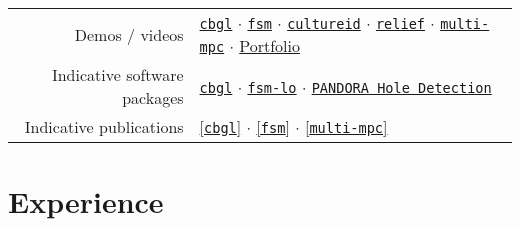 \documentclass[a4paper,10pt,twoside]{article}
\begin{document}
\vspace{+0.1cm}
\begin{tabular}{rl}

  Demos / videos & \href{https://www.youtube.com/watch?v=xaDKjI0WkDc}{\texttt{cbgl}} $\cdot$ \href{https://www.youtube.com/watch?v=hB4qsHCEXGI}{\texttt{fsm}} $\cdot$ \href{https://cultureid.web.auth.gr/?page\_id=200&lang=en}{\texttt{cultureid}} $\cdot$ \href{https://relief.web.auth.gr/}{\texttt{relief}} $\cdot$ \href{https://www.youtube.com/watch?v=937OZez1iN8}{\texttt{multi-mpc}} $\cdot$ \href{https://docs.google.com/viewer?url=https://raw.githubusercontent.com/li9i/portfolio/master/portfolio.pdf}{Portfolio} \\

  Indicative software packages &
  \href{https://github.com/li9i/cbgl}{\texttt{cbgl}} $\cdot$
  \href{https://github.com/li9i/fsm-lo}{\texttt{fsm-lo}} $\cdot$
  \href{https://github.com/li9i/pandora\_vision\_2014/tree/hydro-devel/pandora\_vision\_hole\_detector}{\texttt{PANDORA Hole Detection}} \\

  Indicative publications &
  \href{https://ieeexplore.ieee.org/abstract/document/10802235}{[\texttt{cbgl}]} $\cdot$
  \href{https://ieeexplore.ieee.org/abstract/document/9981228}{[\texttt{fsm}]} $\cdot$
  \href{https://www.tandfonline.com/doi/full/10.1080/00207179.2018.1514129}{[\texttt{multi-mpc}]} \\

\end{tabular}

\section{Experience}
\end{document}
